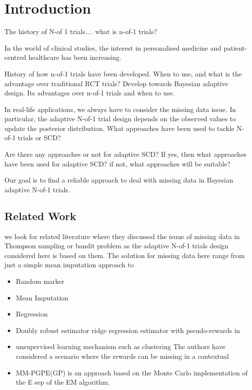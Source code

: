 \chapter{Introduction}

The history of N-of 1 trials....\cite{Senarathne2020}
what is n-of-1 trials?

In the world of clinical studies, the interest in personalised medicine and patient-centred healthcare has been increasing. 
 
History of how n-of-1 trials have been developed. 
When to use, and what is the advantage over traditional RCT trials?
Develop towards Bayesian adaptive design.
Its advantages over n-of-1 trials and when to use.

In real-life applications, we always have to consider the missing data issue. In particular, the adaptive N-of-1 trial design depends on the observed values to update the posterior distribution. 
What approaches have been used to tackle N-of-1 trials or SCD?

Are there any approaches or not for adaptive SCD?
If yes, then what approaches have been used for adaptive SCD?
if not, what approaches will be suitable?


Our goal is to find a reliable approach to deal with missing data in Bayesian adaptive N-of-1 trials.

\section{Related Work}
 
we look for related literature where they discussed the isuue of missing data in Thompson sampling or bandit 
problem as the adaptive N-of-1 trials design considered here is based on them. The solution for missing data 
here range from just a simple mean imputation approach to    

\begin{itemize}
    \item Random marker
    \item Mean Imputation \cite{Chen2022}
    \item Regression
    \item Doubly robust estimator ridge regression estimator with pseudo-rewards in\cite{Kim}
    \item unsupervised learning mechanism such as clustering\cite{Bouneffouf2020}
    The authors have considered a scenario where the rewards can be missing in a contextual 
    \item MM-PGPE(GP) is an approach based on the Monte Carlo implementation of the E sep of the EM algorithm.\cite{Wei1990}\cite{Yamaguchi2020}
\end{itemize}

